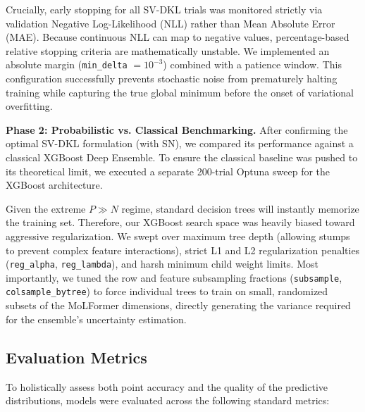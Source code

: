Crucially, early stopping for all SV-DKL trials was monitored strictly via validation Negative Log-Likelihood (NLL) rather than Mean Absolute Error (MAE). Because continuous NLL can map to negative values, percentage-based relative stopping criteria are mathematically unstable. We implemented an absolute margin (\texttt{min\_delta} $= 10^{-3}$) combined with a patience window. This configuration successfully prevents stochastic noise from prematurely halting training while capturing the true global minimum before the onset of variational overfitting.

\textbf{Phase 2: Probabilistic vs. Classical Benchmarking.} After confirming the optimal SV-DKL formulation (with SN), we compared its performance against a classical XGBoost Deep Ensemble. To ensure the classical baseline was pushed to its theoretical limit, we executed a separate 200-trial Optuna sweep for the XGBoost architecture. 

Given the extreme $P \gg N$ regime, standard decision trees will instantly memorize the training set. Therefore, our XGBoost search space was heavily biased toward aggressive regularization. We swept over maximum tree depth (allowing stumps to prevent complex feature interactions), strict L1 and L2 regularization penalties (\texttt{reg\_alpha}, \texttt{reg\_lambda}), and harsh minimum child weight limits. Most importantly, we tuned the row and feature subsampling fractions (\texttt{subsample}, \texttt{colsample\_bytree}) to force individual trees to train on small, randomized subsets of the MoLFormer dimensions, directly generating the variance required for the ensemble's uncertainty estimation.

\subsection{Evaluation Metrics}
To holistically assess both point accuracy and the quality of the predictive distributions, models were evaluated across the following standard metrics:

